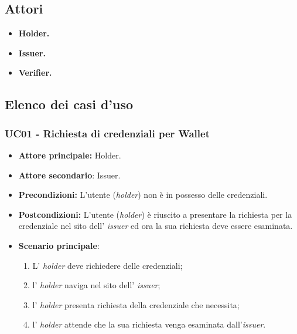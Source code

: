 \subsection{Attori}
\begin{itemize}
    \item\textbf{Holder.}
    \item\textbf{Issuer.}
    \item\textbf{Verifier.}
\end{itemize}

\subsection{Elenco dei casi d'uso}
\subsubsection{UC01 - Richiesta di credenziali per Wallet}
\begin{itemize}
\item \textbf{Attore principale:} Holder.
\item \textbf{Attore secondario}: Issuer. 
\item \textbf{Precondizioni:} L’utente (\textit{holder}) non è in possesso delle credenziali.
\item \textbf{Postcondizioni:} L’utente (\textit{holder}) è riuscito a presentare la richiesta per la credenziale nel sito dell’ \textit{issuer} ed ora la sua richiesta deve essere esaminata.
\item \textbf{Scenario principale}: 
    \begin{enumerate}
        \item L' \textit{holder} deve richiedere delle credenziali; 
        \item l' \textit{holder} naviga nel sito dell' \textit{issuer}; 
        \item l' \textit{holder} presenta richiesta della credenziale che necessita; 
        \item l' \textit{holder} attende che la sua richiesta venga esaminata dall'\textit{issuer}.
    \end{enumerate}
\end{itemize}

